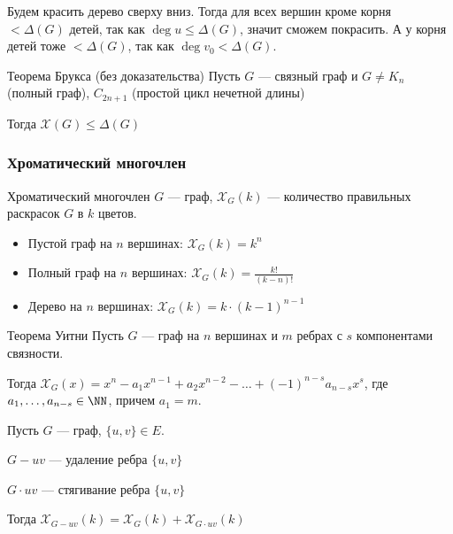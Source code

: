 Будем красить дерево сверху вниз.
Тогда для всех вершин кроме корня \( < \Delta (G) \) детей, так как \( \deg u \leq \Delta (G) \), значит сможем покрасить.
А у корня детей тоже \( < \Delta (G) \), так как \( \deg v_0 < \Delta (G) \).

\begin{thrm}{Теорема Брукса (без доказательства)}{}
    Пусть \( G \) --- связный граф и \( G \neq K_n \) (полный граф), \( C_{2n + 1} \) (простой цикл нечетной длины)

    Тогда \( \mathcal{X} (G) \leq \Delta (G) \)
\end{thrm}

\subsubsection{Хроматический многочлен}

\begin{defn}{Хроматический многочлен}{}
    \( G \) --- граф, \( \mathcal{X}_G(k) \) --- количество правильных раскрасок \( G \) в \( k \) цветов.
\end{defn}

\begin{example}{}{}
    \begin{itemize}
        \item
            Пустой граф на \( n \) вершинах: \( \mathcal{X}_G(k) = k^n \)
        \item
            Полный граф на \( n \) вершинах: \( \mathcal{X}_G(k) = \frac{k!}{(k - n)!} \)
        \item
            Дерево на \( n \) вершинах: \( \mathcal{X}_G(k) = k \cdot (k - 1)^{n - 1} \)
    \end{itemize}
\end{example}

\begin{thrm}{Теорема Уитни}{}
    Пусть \( G \) --- граф на \( n \) вершинах и \( m \) ребрах с \( s \) компонентами связности.

    Тогда \( \mathcal{X}_G(x) = x^n - a_1 x^{n - 1} + a_2 x^{n - 2} - \ldots + (-1)^{n - s} a_{n - s} x^s \),
    где \( a_1, \ldots, a_{n - s} \in \NN \), причем \( a_1 = m \).
\end{thrm}

\begin{lemma}{}{}
    Пусть \( G \) --- граф, \( \{ u, v \} \in E \).

    \( G - uv \) --- удаление ребра \( \{ u, v \} \)

    \( G \cdot uv \) --- стягивание ребра \( \{ u, v \} \)

    Тогда \( \mathcal{X}_{G - uv}(k) = \mathcal{X}_G(k) + \mathcal{X}_{G \cdot uv}(k) \)
\end{lemma}

